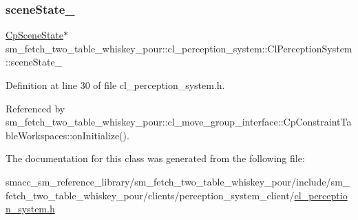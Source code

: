 \subsubsection{\texorpdfstring{scene\+State\+\_\+}{sceneState\_}}
{\footnotesize\ttfamily \hyperlink{classsm__fetch__two__table__whiskey__pour_1_1cl__perception__system_1_1CpSceneState}{Cp\+Scene\+State}$\ast$ sm\+\_\+fetch\+\_\+two\+\_\+table\+\_\+whiskey\+\_\+pour\+::cl\+\_\+perception\+\_\+system\+::\+Cl\+Perception\+System\+::scene\+State\+\_\+}



Definition at line 30 of file cl\+\_\+perception\+\_\+system.\+h.



Referenced by sm\+\_\+fetch\+\_\+two\+\_\+table\+\_\+whiskey\+\_\+pour\+::cl\+\_\+move\+\_\+group\+\_\+interface\+::\+Cp\+Constraint\+Table\+Workspaces\+::on\+Initialize().



The documentation for this class was generated from the following file\+:\begin{DoxyCompactItemize}
\item 
smacc\+\_\+sm\+\_\+reference\+\_\+library/sm\+\_\+fetch\+\_\+two\+\_\+table\+\_\+whiskey\+\_\+pour/include/sm\+\_\+fetch\+\_\+two\+\_\+table\+\_\+whiskey\+\_\+pour/clients/perception\+\_\+system\+\_\+client/\hyperlink{sm__fetch__two__table__whiskey__pour_2include_2sm__fetch__two__table__whiskey__pour_2clients_2pe3c1fd65b94a4ced08d60bd85111dc4ee}{cl\+\_\+perception\+\_\+system.\+h}\end{DoxyCompactItemize}
